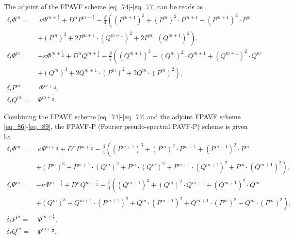 \documentclass[preprint,compress,3p,10pt,fleqn]{elsarticle}
\numberwithin{equation}{section}
\begin{document}
The adjoint of the FPAVF scheme \eqref{eq_74}-\eqref{eq_77} can be reads as
\begin{align}
\delta_{t} \varPhi^{m}=&~\kappa \Psi^{m+\frac{1}{2}}+D^{\alpha} P^{m+\frac{1}{2}}-\frac{\beta}{4}\left( (P^{m+1})^3+ (P^{m})^{2}\cdot P^{m+1}+(P^{m+1})^{2}\cdot P^{m}\right.\nonumber\\
	&\left.+ (P^{m})^{3}+2 P^{m+1}\cdot (Q^{m+1})^{2}+2 P^{m}\cdot (Q^{m+1})^{2}\right),\label{eq_86}\\
\delta_{t} \Psi^{m}=&-\kappa \varPhi^{m+\frac{1}{2}}+D^{\alpha} Q^{m+\frac{1}{2}}-\frac{\beta}{4}\left( (Q^{m+1})^3+ (Q^{m})^{2}\cdot Q^{m+1}+ (Q^{m+1})^{2}\cdot Q^{m}\right.\nonumber\\
	&\left.+ (Q^{m})^{3}+2 Q^{m+1}\cdot (P^{m})^{2}+2 Q^{m}\cdot (P^{m})^{2}\right),\label{eq_87}\\
\delta_{t} P^{m}=&~\varPhi^{m+\frac{1}{2}},\label{eq_88}\\
\delta_{t} Q^{m}=~&\Psi^{m+\frac{1}{2}}.\label{eq_89}
\end{align}

Combining the FPAVF scheme \eqref{eq_74}-\eqref{eq_77} and the adjoint FPAVF scheme \eqref{eq_86}-\eqref{eq_89}, the FPAVF-P (Fourier pseudo-spectral PAVF-P) scheme is given by
\begin{align}
\delta_{t} \varPhi^{m}=&~\kappa \Psi^{m+\frac{1}{2}}+D^{\alpha} P^{m+\frac{1}{2}}-\frac{\beta}{4}\left((P^{m+1})^3+(P^{m})^{2}\cdot P^{m+1}+(P^{m+1})^{2}\cdot P^{m}\right.\nonumber\\
	&\left.+(P^{m})^{3}+P^{m+1}\cdot (Q^{m})^{2}+P^{m}\cdot (Q^{m})^{2}+P^{m+1}\cdot (Q^{m+1})^{2}+P^{m}\cdot (Q^{m+1})^{2}\right),\label{eq_98}\\
\delta_{t} \Psi^{m}=&-\kappa \varPhi^{m+\frac{1}{2}}+D^{\alpha} Q^{m+\frac{1}{2}}-\frac{\beta}{4}\left((Q^{m+1})^3+(Q^{m})^{2}\cdot Q^{m+1}+(Q^{m+1})^{2}\cdot Q^{m}\right.\nonumber\\
	&\left.+(Q^{m})^{3}+Q^{m+1}\cdot (P^{m+1})^{2}+Q^{m}\cdot (P^{m+1})^{2}+Q^{m+1}\cdot (P^{m})^{2}+Q^{m}\cdot (P^{m})^{2}\right),\label{eq_99}\\
\delta_{t} P^{m}=&~\varPhi^{m+\frac{1}{2}},\label{eq_100}\\
\delta_{t} Q^{m}=&~\Psi^{m+\frac{1}{2}}.\label{eq_101}
\end{align}
\end{document}
